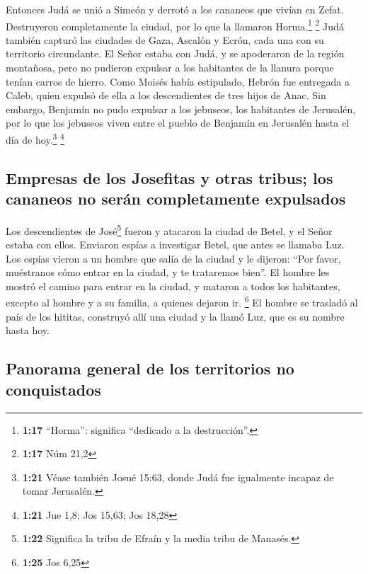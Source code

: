  Entonces Judá se unió a Simeón y derrotó a los cananeos
que vivían en Zefat. Destruyeron completamente la ciudad, por lo que la
llamaron Horma.\footnote{\textbf{1:17} ``Horma'': significa ``dedicado a
  la destrucción''.} \footnote{\textbf{1:17} Núm 21,2} 
Judá también capturó las ciudades de Gaza, Ascalón y Ecrón, cada una con
su territorio circundante.  El Señor estaba con Judá, y
se apoderaron de la región montañosa, pero no pudieron expulsar a los
habitantes de la llanura porque tenían carros de hierro. 
Como Moisés había estipulado, Hebrón fue entregada a Caleb, quien
expulsó de ella a los descendientes de tres hijos de Anac.
 Sin embargo, Benjamín no pudo expulsar a los jebuseos,
los habitantes de Jerusalén, por lo que los jebuseos viven entre el
pueblo de Benjamín en Jerusalén hasta el día de hoy.\footnote{\textbf{1:21}
  Véase también Josué 15:63, donde Judá fue igualmente incapaz de tomar
  Jerusalén.} \footnote{\textbf{1:21} Jue 1,8; Jos 15,63; Jos 18,28}

\hypertarget{empresas-de-los-josefitas-y-otras-tribus-los-cananeos-no-seruxe1n-completamente-expulsados}{%
\subsection{Empresas de los Josefitas y otras tribus; los cananeos no
serán completamente
expulsados}\label{empresas-de-los-josefitas-y-otras-tribus-los-cananeos-no-seruxe1n-completamente-expulsados}}

 Los descendientes de José\footnote{\textbf{1:22}
  Significa la tribu de Efraín y la media tribu de Manasés.} fueron y
atacaron la ciudad de Betel, y el Señor estaba con ellos.
 Enviaron espías a investigar Betel, que antes se llamaba
Luz.  Los espías vieron a un hombre que salía de la
ciudad y le dijeron: ``Por favor, muéstranos cómo entrar en la ciudad, y
te trataremos bien''.  El hombre les mostró el camino
para entrar en la ciudad, y mataron a todos los habitantes, excepto al
hombre y a su familia, a quienes dejaron ir. \footnote{\textbf{1:25} Jos
  6,25}  El hombre se trasladó al país de los hititas,
construyó allí una ciudad y la llamó Luz, que es su nombre hasta hoy.

\hypertarget{panorama-general-de-los-territorios-no-conquistados}{%
\subsection{Panorama general de los territorios no
conquistados}\label{panorama-general-de-los-territorios-no-conquistados}}

